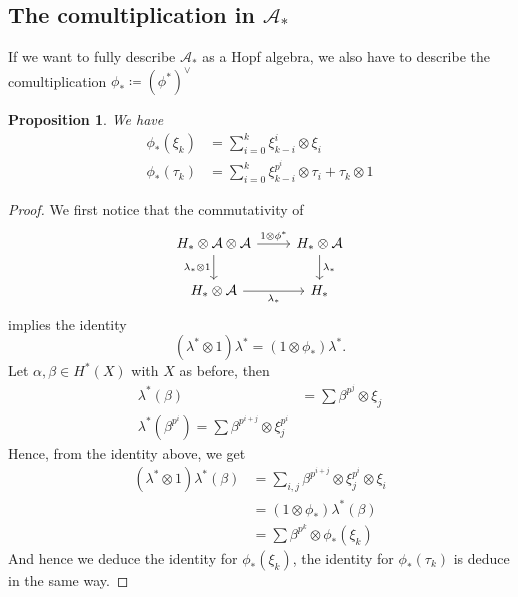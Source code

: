 \documentclass[11pt, a4paper]{article}
\newtheorem{propo}[thm]{Proposition}
\theoremstyle{plain}
\newtheorem*{proof}{Proof}
\begin{document}
\subsection{The comultiplication in $\mathcal{A}_\ast$}

If we want to fully describe $\mathcal{A}_\ast$ as a Hopf algebra, we also have to describe the comultiplication $\phi_\ast\coloneq  ( \phi^{\ast})^{\vee}$

\begin{propo}
We have
\begin{align*}
	\phi_\ast( \xi_k) &= \sum_{i=0}^{k}\xi_{k-i}^{i}\otimes \xi_i\\
\phi_\ast( \tau_k) &= \sum_{i=0}^{k}\xi_{k-i} ^{p^{i}}\otimes \tau_i + \tau_k \otimes 1
\end{align*}
\end{propo}
\begin{proof}
	We first notice that the commutativity of
\[\begin{tikzcd}
	{H_\ast\otimes \mathcal{A}\otimes \mathcal{A}} & {H_\ast\otimes \mathcal{A}} \\
	{H_\ast\otimes \mathcal{A}} & {H_\ast}
	\arrow["{1\otimes \phi^\ast}", from=1-1, to=1-2]
	\arrow["{\lambda_\ast\otimes1}"', from=1-1, to=2-1]
	\arrow["{\lambda_\ast}"', from=2-1, to=2-2]
	\arrow["{\lambda_\ast}", from=1-2, to=2-2]
\end{tikzcd}\]
implies the identity
\[ 
	( \lambda^{\ast}\otimes 1) \lambda^{\ast}= ( 1\otimes\phi_\ast) \lambda^{\ast}.
\]
	Let $\alpha,\beta \in H^{\ast}( X) $ with $X$ as before, then
\begin{align*}
	\lambda^{\ast}( \beta) &= \sum \beta^{p^{j}}\otimes \xi_j\\
	\lambda^{\ast}( \beta^{p^{i}}) = \sum \beta^{p^{i+j}}\otimes \xi_j^{p^{i}}
\end{align*}
Hence, from the identity above, we get
\begin{align*}
( \lambda^{\ast}\otimes 1) \lambda^{\ast}( \beta) &= \sum_{i,j} \beta^{p^{i+j}}\otimes \xi_j^{p^{i}}\otimes \xi_i\\
&= ( 1\otimes \phi_\ast) \lambda^{\ast}( \beta) \\
&= \sum \beta^{p^{k}}\otimes \phi_\ast( \xi_k) 
\end{align*}
And hence we deduce the identity for $\phi_\ast( \xi_k) $, the identity for $\phi_\ast( \tau_k) $ is deduce in the same way.

\end{proof}




\printbibliography
\end{document}
